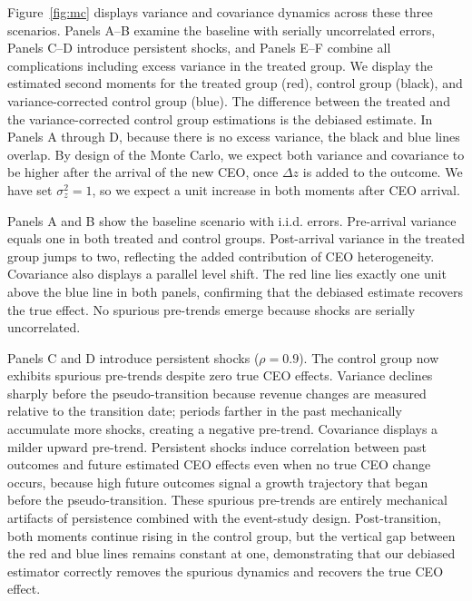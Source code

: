 \documentclass[11pt,a4paper]{article}
\begin{document}
Figure~\ref{fig:mc} displays variance and covariance dynamics across these three scenarios. Panels A--B examine the baseline with serially uncorrelated errors, Panels C--D introduce persistent shocks, and Panels E--F combine all complications including excess variance in the treated group. We display the estimated second moments for the treated group (red), control group (black), and variance-corrected control group (blue). The difference between the treated and the variance-corrected control group estimations is the debiased estimate. In Panels A through D, because there is no excess variance, the black and blue lines overlap. By design of the Monte Carlo, we expect both variance and covariance to be higher after the arrival of the new CEO, once $\Delta z$ is added to the outcome. We have set $\sigma^2_z=1$, so we expect a unit increase in both moments after CEO arrival.

Panels A and B show the baseline scenario with i.i.d. errors. Pre-arrival variance equals one in both treated and control groups. Post-arrival variance in the treated group jumps to two, reflecting the added contribution of CEO heterogeneity. Covariance also displays a parallel level shift. The red line lies exactly one unit above the blue line in both panels, confirming that the debiased estimate recovers the true effect. No spurious pre-trends emerge because shocks are serially uncorrelated. 

Panels C and D introduce persistent shocks ($\rho=0.9$). The control group now exhibits spurious pre-trends despite zero true CEO effects. Variance declines sharply before the pseudo-transition because revenue changes are measured relative to the transition date; periods farther in the past mechanically accumulate more shocks, creating a negative pre-trend. Covariance displays a milder upward pre-trend. Persistent shocks induce correlation between past outcomes and future estimated CEO effects even when no true CEO change occurs, because high future outcomes signal a growth trajectory that began before the pseudo-transition. These spurious pre-trends are entirely mechanical artifacts of persistence combined with the event-study design. Post-transition, both moments continue rising in the control group, but the vertical gap between the red and blue lines remains constant at one, demonstrating that our debiased estimator correctly removes the spurious dynamics and recovers the true CEO effect.
\end{document}
